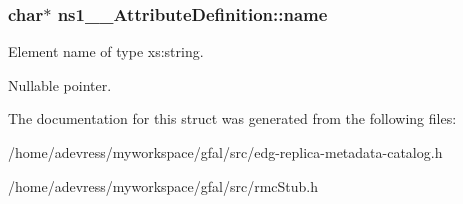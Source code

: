\subsubsection{\setlength{\rightskip}{0pt plus 5cm}char$\ast$ \bf{ns1\_\-\_\-Attribute\-Definition::name}}\label{structns1____AttributeDefinition_8c8228f233c0472df79a636b549dfb7a}


Element name of type xs:string. 

Nullable pointer. 

The documentation for this struct was generated from the following files:\begin{CompactItemize}
\item 
/home/adevress/myworkspace/gfal/src/edg-replica-metadata-catalog.h\item 
/home/adevress/myworkspace/gfal/src/rmc\-Stub.h\end{CompactItemize}
